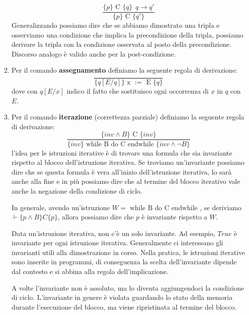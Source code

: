 \begin{enumerate}
\begin{equation}
              \frac{\{p\} \text{ C } \{q\} \ \ q \to q'}{\{p\} \text{ C } \{q'\}}
          \end{equation}
          Generalizzando possiamo dire che se abbiamo dimostrato una tripla e
          osserviamo una condizione che implica la precondizione della tripla,
          possiamo derivare la tripla con la condizione osservata al posto della
          precondizione. Discorso analogo è valido anche per la post-condizione.
    \item Per il comando \textbf{assegnamento} definiamo la seguente regola di derivazione:
          \begin{equation}
              \frac{}{\{q[E/q]\} \text{ x } := \text{ E }\{q\}}
          \end{equation}
          dove con $q[E / x]$ indico il fatto che sostituisco ogni occorrenza di
          $x$ in $q$ con $E$.
    \item Per il comando \textbf{iterazione} (correttezza parziale) definiamo la
          seguente regola di derivazione:
          \begin{equation}
              \frac{\{inv \land B\} \text{ C } \{inv\}}{\{inv\} \text{ while B do C endwhile } \{inv \land \lnot B\}}
          \end{equation}
          l'idea per le istruzioni iterative è di trovare una formula che sia
          invariante rispetto al blocco dell'istruzione iterativa. Se troviamo
          un'invariante possiamo dire che se questa formula è vera all'inizio
          dell'istruzione iterativa, lo sarà anche alla fine e in più possiamo
          dire che al termine del blocco iterativo vale anche la negazione della
          condizione di ciclo.

          In generale, avendo un'istruzione $W = \text{ while B do C endwhile }$,
          se deriviamo $\vdash \{p \land B\} C \{p\}$, allora possiamo dire che
          $p$ è invariante rispetto a $W$.

          Data un'istruzione iterativa, non c'è un solo invariante. Ad esempio,
          $True$ è invariante per ogni istruzione iterativa. Generalmente ci
          interessano gli invarianti utili alla dimostrazione in corso. Nella
          pratica, le istruzioni iterative sono inserite in programmi, di conseguenza
          la scelta dell'invariante dipende dal contesto e si abbina alla regola
          dell'implicazione.

          A volte l'invariante non è assoluto, ma lo diventa aggiungendoci la
          condizione di ciclo. L'invariante in genere è violata guardando lo
          stato della memoria durante l'esecuzione del blocco, ma viene ripristinata
          al termine del blocco.
\end{enumerate}

